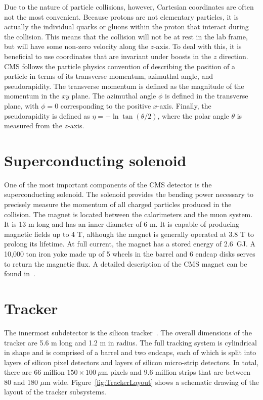 Due to the nature of particle collisions, however, Cartesian coordinates are often not the most convenient. Because protons are not elementary particles, it is actually the individual quarks or gluons within the proton that interact during the collision. This means that the collision will not be at rest in the lab frame, but will have some non-zero velocity along the $z$-axis. To deal with this, it is beneficial to use coordinates that are invariant under boosts in the $z$ direction. CMS follows the particle physics convention of describing the position of a particle in terms of its transverse momentum, azimuthal angle, and pseudorapidity. The transverse momentum \pt is defined as the magnitude of the momentum in the $xy$ plane. The azimuthal angle $\phi$ is defined in the transverse plane, with $\phi  = 0$ corresponding to the positive $x$-axis. Finally, the pseudorapidity is defined as $\eta = -\ln{\tan{ (\theta / 2 )} } $, where the polar angle $\theta$ is measured from the $z$-axis. 


\section{Superconducting solenoid}
\label{sec:magnet}

One of the most important components of the CMS detector is the superconducting solenoid. The solenoid provides the bending power necessary to precisely measure the momentum of all charged particles produced in the collision. The magnet is located between the calorimeters and the muon system. It is 13 m long and has an inner diameter of 6 m. It is capable of producing magnetic fields up to 4 T, although the magnet is generally operated at 3.8 T to prolong its lifetime. At full current, the magnet has a stored energy of 2.6~GJ. A 10,000 ton iron yoke made up of 5 wheels in the barrel and 6 endcap disks serves to return the magnetic flux. A detailed description of the CMS magnet can be found in~\cite{magnetTDR}.


\section{Tracker}
\label{sec:Tracker}

The innermost subdetector is the silicon tracker~\cite{trackerTDR,trackerTDRAddendum}. The overall dimensions of the tracker are 5.6 m long and 1.2 m in radius. The full tracking system is cylindrical in shape and is comprised of a barrel and two endcaps, each of which is split into layers of silicon pixel detectors and layers of silicon micro-strip detectors. In total, there are 66 million $150\times100~\mu$m pixels and 9.6 million strips that are between 80 and 180 $\mu$m wide. Figure~\ref{fig:TrackerLayout} shows a schematic drawing of the layout of the tracker subsystems. 


